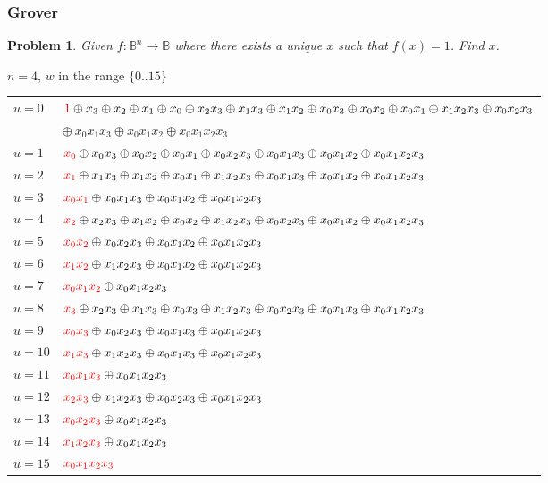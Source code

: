 \documentclass{beamer}
\newcommand{\red}[1]{{\color{red}{#1}}}
\newcommand{\Bool}{\ensuremath{\mathbb{B}}}
\newtheorem{prob}{Problem}
\begin{document}

\begin{frame}

  \frametitle{Grover}

\begin{prob}
    Given $f : \Bool^n\rightarrow\Bool$ where there exists a unique $x$
    such that $f(x)=1$. Find $x$.
\end{prob}

\pause

$n=4$, $w$ in the range $\{0..15\}$
  {\tiny
\begin{tabular}{ll}
$u=0$ & 
  $\red{1} \oplus x_3 \oplus x_2 \oplus x_1 \oplus x_0 \oplus x_2x_3 \oplus x_1x_3 \oplus x_1x_2 \oplus x_0x_3 \oplus x_0x_2 \oplus x_0x_1 \oplus x_1x_2x_3 \oplus x_0x_2x_3$ \\
   &\quad $\oplus ~x_0x_1x_3 \oplus x_0x_1x_2 \oplus x_0x_1x_2x_3$ \\
$u=1$ & 
  $\red{x_0} \oplus x_0x_3 \oplus x_0x_2 \oplus x_0x_1 \oplus x_0x_2x_3 \oplus x_0x_1x_3 \oplus x_0x_1x_2 \oplus x_0x_1x_2x_3$ \\
$u=2$ &
  $\red{x_1} \oplus x_1x_3 \oplus x_1x_2 \oplus x_0x_1 \oplus x_1x_2x_3 \oplus x_0x_1x_3 \oplus x_0x_1x_2 \oplus x_0x_1x_2x_3$ \\
$u=3$ &
  $\red{x_0x_1} \oplus x_0x_1x_3 \oplus x_0x_1x_2 \oplus x_0x_1x_2x_3$ \\
$u=4$ &
  $\red{x_2} \oplus x_2x_3 \oplus x_1x_2 \oplus x_0x_2 \oplus x_1x_2x_3 \oplus x_0x_2x_3 \oplus x_0x_1x_2 \oplus x_0x_1x_2x_3$ \\
$u=5$ &
  $\red{x_0x_2} \oplus x_0x_2x_3 \oplus x_0x_1x_2 \oplus x_0x_1x_2x_3$ \\
$u=6$ &
  $\red{x_1x_2} \oplus x_1x_2x_3 \oplus x_0x_1x_2 \oplus x_0x_1x_2x_3$ \\
$u=7$ &
  $\red{x_0x_1x_2} \oplus x_0x_1x_2x_3$ \\
$u=8$ &
  $\red{x_3} \oplus x_2x_3 \oplus x_1x_3 \oplus x_0x_3 \oplus x_1x_2x_3 \oplus x_0x_2x_3 \oplus x_0x_1x_3 \oplus x_0x_1x_2x_3$ \\
$u=9$ &
  $\red{x_0x_3} \oplus x_0x_2x_3 \oplus x_0x_1x_3 \oplus x_0x_1x_2x_3$ \\
$u=10$ &
  $\red{x_1x_3} \oplus x_1x_2x_3 \oplus x_0x_1x_3 \oplus x_0x_1x_2x_3$ \\
$u=11$ &
  $\red{x_0x_1x_3} \oplus x_0x_1x_2x_3$ \\
$u=12$ &
  $\red{x_2x_3} \oplus x_1x_2x_3 \oplus x_0x_2x_3 \oplus x_0x_1x_2x_3$ \\
$u=13$ &
  $\red{x_0x_2x_3} \oplus x_0x_1x_2x_3$ \\
$u=14$ &
  $\red{x_1x_2x_3} \oplus x_0x_1x_2x_3$ \\
$u=15$ &
  $\red{x_0x_1x_2x_3}$
\end{tabular}
  }

\end{frame}
\end{document}
